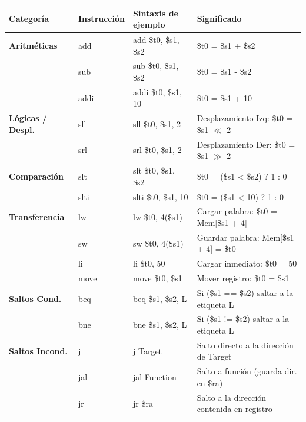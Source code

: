\documentclass[11pt, a4paper]{article}
\begin{document}
\begin{table}[h!]
    \centering
    \renewcommand{\arraystretch}{1.1}
    \begin{tabularx}{\textwidth}{@{} l l l X @{}}
        \toprule
        \textbf{Categoría} & \textbf{Instrucción} & \textbf{Sintaxis de ejemplo} & \textbf{Significado} \\
        \midrule
        \textbf{Aritméticas} 
        & add & add \$t0, \$s1, \$s2 & \$t0 = \$s1 + \$s2 \\
        & sub & sub \$t0, \$s1, \$s2 & \$t0 = \$s1 - \$s2 \\
        & addi & addi \$t0, \$s1, 10 & \$t0 = \$s1 + 10 \\
        \midrule
        \textbf{Lógicas / Despl.}
        & sll & sll \$t0, \$s1, 2 & Desplazamiento Izq: \$t0 = \$s1 $\ll$ 2 \\
        & srl & srl \$t0, \$s1, 2 & Desplazamiento Der: \$t0 = \$s1 $\gg$ 2 \\
        \midrule
        \textbf{Comparación}
        & slt & slt \$t0, \$s1, \$s2 & \$t0 = (\$s1 < \$s2) ? 1 : 0 \\
        & slti & slti \$t0, \$s1, 10 & \$t0 = (\$s1 < 10) ? 1 : 0 \\
        \midrule
        \textbf{Transferencia}
        & lw & lw \$t0, 4(\$s1) & Cargar palabra: \$t0 = Mem[\$s1 + 4] \\
        & sw & sw \$t0, 4(\$s1) & Guardar palabra: Mem[\$s1 + 4] = \$t0 \\
        & li & li \$t0, 50 & Cargar inmediato: \$t0 = 50 \\
        & move & move \$t0, \$s1 & Mover registro: \$t0 = \$s1 \\
        \midrule
        \textbf{Saltos Cond.}
        & beq & beq \$s1, \$s2, L & Si (\$s1 == \$s2) saltar a la etiqueta L \\
        & bne & bne \$s1, \$s2, L & Si (\$s1 != \$s2) saltar a la etiqueta L \\
        \midrule
        \textbf{Saltos Incond.}
        & j & j Target & Salto directo a la dirección de Target \\
        & jal & jal Function & Salto a función (guarda dir. en \$ra) \\
        & jr & jr \$ra & Salto a la dirección contenida en registro \\
        \bottomrule
    \end{tabularx}
\end{table}
\end{document}
